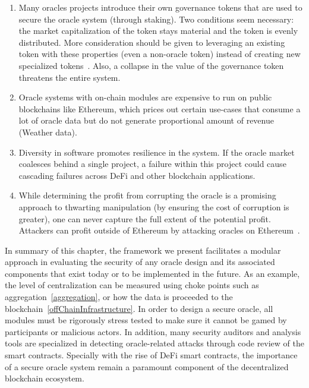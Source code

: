 \begin{enumerate}
    \item Many oracles projects introduce their own governance tokens that are used to secure the oracle system (\eg through staking). Two conditions seem necessary: the market capitalization of the token stays material and the token is evenly distributed. More consideration should be given to leveraging an existing token with these properties (even a non-oracle token) instead of creating new specialized tokens~\cite{vitalikuni}. Also, a collapse in the value of the governance token threatens the entire system.

    \item Oracle systems with on-chain modules are expensive to run on public blockchains like Ethereum, which prices out certain use-cases that consume a lot of oracle data but do not generate proportional amount of revenue (\eg Weather data). 


    \item Diversity in software promotes resilience in the system. If the oracle market coalesces  behind a single project, a failure within this project could cause cascading failures across DeFi and other blockchain applications.  

    \item While determining the profit from corrupting the oracle is a promising approach to thwarting manipulation (by ensuring the cost of corruption is greater), one can never capture the full extent of the potential profit. Attackers can profit outside of Ethereum by attacking oracles on Ethereum~\cite{FoBo19}.

\end{enumerate}

In summary of this chapter, the framework we present facilitates a modular approach in evaluating the security of any oracle design and its associated components that exist today or to be implemented in the future. As an example, the level of centralization can be measured using choke points such as aggregation~\ref{aggregation}, or how the data is proceeded to the blockchain~\ref{offChainInfrastructure}. In order to design a secure oracle, all modules must be rigorously stress tested to make sure it cannot be gamed by participants or malicious actors. In addition, many security auditors and analysis tools are specialized in detecting oracle-related attacks through code review of the smart contracts. Specially with the rise of DeFi smart contracts, the importance of a secure oracle system remain a paramount component of the decentralized blockchain ecosystem.



